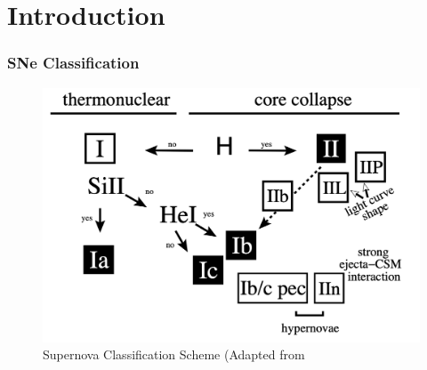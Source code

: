 \section{Introduction}
\begin{frame}
    \frametitle{SNe Classification}
    \begin{figure}[t]
        \centering
        \includegraphics[width=0.7\linewidth]{figures/supernova_class.png }
        \caption{Supernova Classification Scheme (Adapted from  \textcite{Turatto2003}}
        \label{fig:sn-classification}
    \end{figure}
\end{frame}

